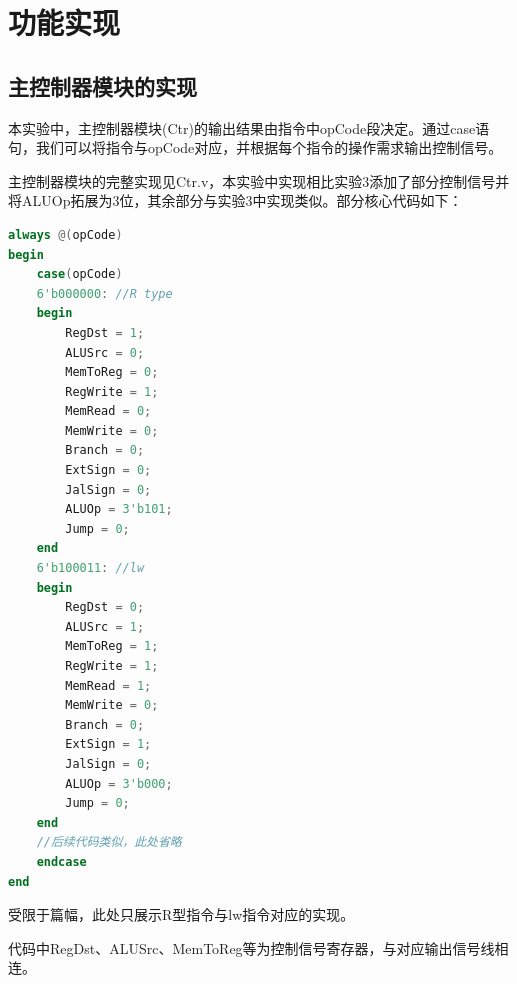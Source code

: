 \documentclass[UTF8]{ctexart}
\begin{document}
\section{功能实现}\label{sec2}

\subsection{主控制器模块的实现}
本实验中，主控制器模块(Ctr)的输出结果由指令中opCode段决定。通过case语句，我们可以将指令与opCode对应，并根据每个指令的操作需求输出控制信号。\par
主控制器模块的完整实现见Ctr.v，本实验中实现相比实验3添加了部分控制信号并将ALUOp拓展为3位，其余部分与实验3中实现类似。部分核心代码如下：
\begin{lstlisting}[language=verilog]
always @(opCode)
begin
    case(opCode)
    6'b000000: //R type
    begin
        RegDst = 1;
        ALUSrc = 0;
        MemToReg = 0;
        RegWrite = 1;
        MemRead = 0;
        MemWrite = 0;
        Branch = 0;
        ExtSign = 0;
        JalSign = 0;
        ALUOp = 3'b101;
        Jump = 0;
    end
    6'b100011: //lw
    begin
        RegDst = 0;
        ALUSrc = 1;
        MemToReg = 1;
        RegWrite = 1;
        MemRead = 1;
        MemWrite = 0;
        Branch = 0;
        ExtSign = 1;
        JalSign = 0;
        ALUOp = 3'b000;
        Jump = 0;
    end
    //后续代码类似，此处省略
    endcase
end
\end{lstlisting}
受限于篇幅，此处只展示R型指令与lw指令对应的实现。\par
代码中RegDst、ALUSrc、MemToReg等为控制信号寄存器，与对应输出信号线相连。
\end{document}
